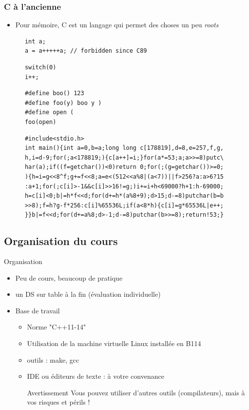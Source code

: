\begin{frame}[fragile]
   \frametitle{C à l'ancienne}
   \begin{itemize}
      \item Pour mémoire, C est un langage qui permet des choses un peu \emph{roots}
   \end{itemize}
   \pause 
   \begin{lstlisting}
      int a;
      a = a+++++a; // forbidden since C89
   \end{lstlisting}
   \pause
   \begin{lstlisting}
      switch(0)
      i++;
   \end{lstlisting}
   \pause 
   \begin{lstlisting}
      #define boo() 123
      #define foo(y) boo y )
      #define open (
      foo(open)
   \end{lstlisting}
   \pause
   \begin{lstlisting}
      #include<stdio.h>
      int main(){int a=0,b=a;long long c[178819],d=8,e=257,f,g,
      h,i=d-9;for(;a<178819;){c[a++]=i;}for(a*=53;a;a>>=8)putc\
      har(a);if((f=getchar())<0)return 0;for(;(g=getchar())>=0;
      ){h=i=g<<8^f;g+=f<<8;a=e<(512<<a%8|(a<7))||f>256?a:a>6?15
      :a+1;for(;c[i]>-1&&c[i]>>16!=g;)i+=i+h<69000?h+1:h-69000;
      h=c[i]<0;b|=h*f<<d;for(d+=h*(a%8+9);d>15;d-=8)putchar(b=b
      >>8);f=h?g-f*256:c[i]%65536L;if(a<8*h){c[i]=g*65536L|e++;
      }}b|=f<<d;for(d+=a%8;d>-1;d-=8)putchar(b>>=8);return!53;}
   \end{lstlisting}
\end{frame}

\subsection{Organisation du cours}

\begin{frame}{Organisation}
\begin{itemize}
\item Peu de cours, beaucoup de pratique
\item un DS sur table à la fin (évaluation individuelle)
\item Base de travail
\begin{itemize}
\item Norme "C++11-14"
\item Utilisation de la machine virtuelle Linux installée en B114
\item outils : make, gcc
\item IDE ou éditeurs de texte : à votre convenance
\begin{alertblock}{Avertissement}
Vous pouvez utiliser d'autres outils (compilateurs), mais à vos risques et périls !
\end{alertblock}
\end{itemize}
\end{itemize}
\end{frame}

